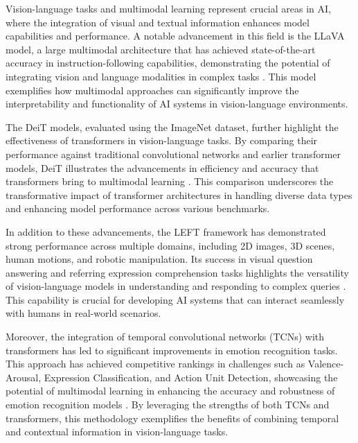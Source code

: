 Vision-language tasks and multimodal learning represent crucial areas in AI, where the integration of visual and textual information enhances model capabilities and performance. A notable advancement in this field is the LLaVA model, a large multimodal architecture that has achieved state-of-the-art accuracy in instruction-following capabilities, demonstrating the potential of integrating vision and language modalities in complex tasks \cite{liu2024visual}. This model exemplifies how multimodal approaches can significantly improve the interpretability and functionality of AI systems in vision-language environments.



The DeiT models, evaluated using the ImageNet dataset, further highlight the effectiveness of transformers in vision-language tasks. By comparing their performance against traditional convolutional networks and earlier transformer models, DeiT illustrates the advancements in efficiency and accuracy that transformers bring to multimodal learning \cite{timagetran4}. This comparison underscores the transformative impact of transformer architectures in handling diverse data types and enhancing model performance across various benchmarks.



In addition to these advancements, the LEFT framework has demonstrated strong performance across multiple domains, including 2D images, 3D scenes, human motions, and robotic manipulation. Its success in visual question answering and referring expression comprehension tasks highlights the versatility of vision-language models in understanding and responding to complex queries \cite{hsu2023whatsleftconceptgrounding}. This capability is crucial for developing AI systems that can interact seamlessly with humans in real-world scenarios.



Moreover, the integration of temporal convolutional networks (TCNs) with transformers has led to significant improvements in emotion recognition tasks. This approach has achieved competitive rankings in challenges such as Valence-Arousal, Expression Classification, and Action Unit Detection, showcasing the potential of multimodal learning in enhancing the accuracy and robustness of emotion recognition models \cite{zhou2023leveragingtcntransformereffective}. By leveraging the strengths of both TCNs and transformers, this methodology exemplifies the benefits of combining temporal and contextual information in vision-language tasks.



